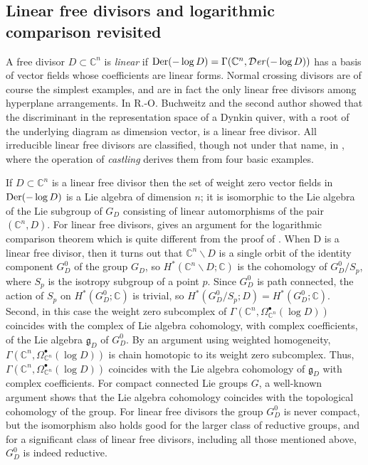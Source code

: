 \documentclass[12pt]{article}
\newcommand{\CC}{\mathbb{C}}
\DeclareMathOperator{\Der}{\rm Der}
\DeclareMathOperator{\fDer}{\mathcal{D}\mathit{er}}
\newcommand\bu{\bullet}
\newcommand\ssm{\smallsetminus}
\newcommand\G{{\Gamma}}
\begin{document}
\subsection{Linear free divisors and logarithmic comparison revisited}\label{linear-free-divisors}

\noindent A free divisor $D\subset \CC^n$ is {\it linear} if $\Der(-\log D) = \Gamma(\CC^n,\fDer(-\log D))$ has a basis of vector fields whose coefficients are linear forms. Normal crossing divisors are of course the simplest examples, and are in fact the only linear free divisors among hyperplane arrangements. In \cite{bm} R.-O. Buchweitz and the second author showed that the discriminant in the representation space of a Dynkin quiver, with a root of the underlying diagram as dimension vector, is a linear free divisor. All irreducible linear free divisors are classified, though not under that name, in \cite{sk}, where the operation of {\it castling} derives them from four basic examples.

If $D\subset \CC^n$ is a linear free divisor then
the set of weight zero vector fields in $\Der(-\log D)$ is a Lie algebra of dimension $n$; it is isomorphic to the Lie algebra of the Lie subgroup of $G_D$ consisting of
linear automorphisms of the pair $(\CC^n,D)$. For linear free divisors, \cite{gmns} gives an argument for the logarithmic comparison theorem which is quite different from the proof of \cite{CMN}.  When D is a linear free divisor, then it turns out that $\CC^n\ssm D$ is a single orbit of the identity component $G^0_D$ of the group $G_D$, so $H^*(\CC^n\ssm D;\CC)$ is the cohomology of $G^0_D/S_p$, where $S_p$ is the isotropy subgroup of a point $p$. Since $G^0_D$ is path connected, the action of $S_p$ on $H^*(G^0_D;\CC)$ is trivial, so $H^*(G^0_D/S_p;D)=H^*(G^0_D;\CC)$. Second, in this case the weight zero subcomplex of $\G(\CC^n,{\Omega}_{\CC^n}^\bu(\log D))$ coincides with the complex of Lie algebra cohomology, with complex coefficients, of the Lie algebra ${\mathfrak{g}}_D$ of $G^0_D$. By an argument using weighted homogeneity, $\G(\CC^n,{\Omega}_{\CC^n}^\bu(\log D))$ is chain homotopic to its weight zero subcomplex. Thus, $\G(\CC^n,{\Omega}_{\CC^n}^\bu(\log D))$ coincides with the Lie algebra cohomology of ${\mathfrak{g}}_D$ with complex coefficients. For compact connected Lie groups $G$, a well-known argument shows that the Lie algebra cohomology coincides with the topological cohomology of the group. For linear free divisors the group $G^0_D$ is never compact, but the isomorphism also holds good for the larger class of reductive groups, and for a significant class of linear free divisors, including all those mentioned above, $G^0_D$ is indeed reductive.
\end{document}

